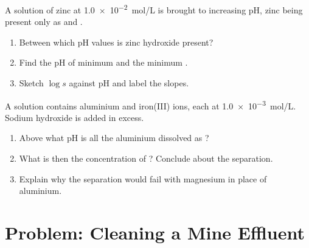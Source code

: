 \begin{exercise}[$\star\star\star$]\label{exo:b1:precipitation:11}
A solution of zinc at \qty{1.0e-2}{mol/L} is brought to increasing pH,
zinc being present only as  and .
\begin{enumerate}
  \item Between which pH values is zinc hydroxide present?
  \item Find the pH of minimum  and the minimum .
  \item Sketch $\log s$ against pH and label the slopes.
\end{enumerate}
\end{exercise}

\begin{exercise}[$\star\star\star$]\label{exo:b1:precipitation:12}
A solution contains aluminium and iron(III) ions, each at
\qty{1.0e-3}{mol/L}. Sodium hydroxide is added in excess.
\begin{enumerate}
  \item Above what pH is all the aluminium dissolved as ?
  \item What is then the concentration of ? Conclude about the
        separation.
  \item Explain why the separation would fail with magnesium in place of
        aluminium.
\end{enumerate}
\end{exercise}

\section{Problem: Cleaning a Mine Effluent}

